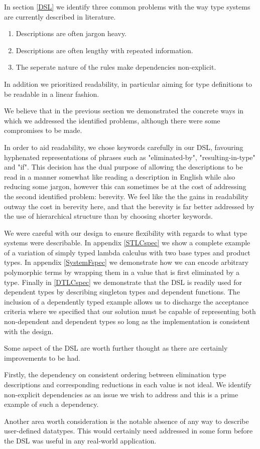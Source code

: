In section \ref{DSL} we identify three common problems with the way type
systems are currently described in literature.

\begin{enumerate}
\item Descriptions are often jargon heavy.
\item Descriptions are often lengthy with repeated information.
\item The seperate nature of the rules make dependencies non-explicit.
\end{enumerate}

In addition we prioritized readability, in particular aiming for type
definitions to be readable in a linear fashion.

We believe that in the previous section we demonstrated the concrete
ways in which we addressed the identified problems, although there
were some compromises to be made.

In order to aid readability, we chose keywords carefully in our
DSL, favouring hyphenated representations of phrases such as
"eliminated-by", "resulting-in-type" and "if". This decision has the dual
purpose of allowing the descriptions to be read in a manner somewhat
like reading a description in English while also reducing some jargon,
however this can sometimes be at the cost of addressing the second
identified problem: berevity. We feel like the the gains in
readability outway the cost in berevity here, and that the berevity is
far better addressed by the use of hierarchical structure than by
choosing shorter keywords. 

We were careful with our design to ensure flexibility with regards to
what type systems were describable. In appendix \ref{STLCspec} we show
a complete example of a variation of simply typed lambda calculus with
two base types and product types. In appendix \ref{SystemFspec} we
demonstrate how we can encode arbitrary polymorphic terms by wrapping
them in a value that is first eliminated by a type. Finally in
\ref{DTLCspec} we demonstrate that the DSL is readily used for
dependent types by describing singleton types and dependent
functions. The inclusion of a dependently typed example allows us to
discharge the acceptance criteria where we specified that our solution
must be capable of representing both non-dependent and dependent types
so long as the implementation is consistent with the design.

Some aspect of the DSL are worth further thought as there are
certainly improvements to be had.

Firstly, the dependency on consistent ordering between elimination
type descriptions and corresponding reductions in each value is not
ideal. We identify non-explicit dependencies as an issue we wish to
address and this is a prime example of such a dependency.

Another area worth consideration is the notable absence of any way to
describe user-defined datatypes. This would certainly need addressed
in some form before the DSL was useful in any real-world application.

